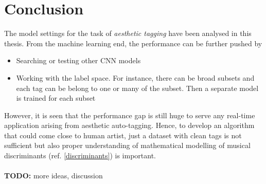 
\chapter{Conclusion} %

\label{Chapter5}
The model settings for the task of \textit{aesthetic tagging} have been analysed in this thesis. From the machine learning end, the performance can be further pushed by 
\begin{itemize}
\setlength\itemsep{0em}
\item Searching or testing other CNN models\cite{choi_transfer}
\item Working with the label space. For instance, there can be broad subsets and each tag can be belong to one or many of the subset. Then a separate model is trained for each subset 
\end{itemize}

\noindent However, it is seen that the performance gap is still huge to serve any real-time application arising from aesthetic auto-tagging. Hence, to develop an algorithm that could come close to human artist, just a dataset with clean tags is not sufficient but also proper understanding of mathematical modelling of musical discriminants (ref. \ref{discriminants}) is important.
\\
\\
\textbf{TODO:} more ideas, discussion   
